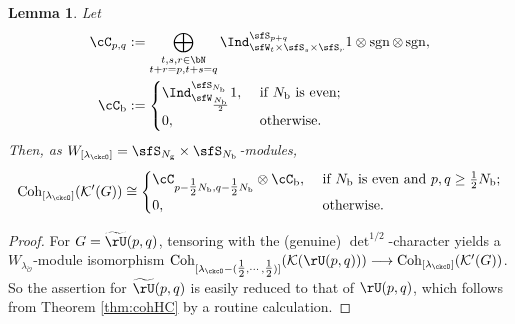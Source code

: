 \documentclass[12pt,a4paper]{amsart}
\newcommand{\trivial}[2][]{\if\relax\detokenize{#1}\relax
  {%
      \color{orange} \vspace{0em} $[$  #2 $]$
      \color{black}
  }
  \else
\ifx#1h
\ifcsname showtrivial\endcsname
{%
    \color{orange} \vspace{0em}  $[$ #2 $]$
    \color{black}
}
\fi
\else {\red Wrong argument!} \fi
\fi
}
\newcommand{\CK}{{\mathcal {K}}}
\newcommand{\CO}{{\mathcal {O}}}
\newcommand{\sgn}{\operatorname{sgn}}
\renewcommand{\t}{\mathfrak t}
\numberwithin{equation}{section}
\newtheorem{lem}[thm]{Lemma}
\theoremstyle{remark}
\def\half{{\tfrac{1}{2}}}
\def\lamck{\lambda_\ckcO}
\def\Lamck{[\lambda_\ckcO]}
\def\WLamck{W_{[\lambda_{\ckcO}]}}
\def\nbb{n_{\mathrm b}}
\def\tU{\widetilde{\rU}}
\def\Coh{\mathrm{Coh}}
\def\Gg{G_{\mathrm g}}
\newcommand{\Lam}{{[\lambda]}}
\begin{document}

\begin{lem}\label{lem:ccrU}
  Let
\[
  \begin{split}
    \cC_{p,q} &:= \bigoplus_{\substack{t,s,r\in \bN\\t+r=p, t+s = q}}
    \Ind_{\sfW_{t}\times \sfS_s\times \sfS_r}^{\sfS_{p+q}}
 1\otimes \sgn \otimes \sgn ,\\
 \cC_{\mathrm b} &:= \begin{cases}
  \Ind_{\sfW_{\frac{N_{\mathrm b}}{2}}}^{\sfS_{N_{\mathrm b}}} 1, & \ \text{if $N_{\mathrm b}$ is even};\\
  0, & \ \text{otherwise}.
 \end{cases}
  \end{split}
\]
Then, as $\WLamck =\sfS_{N_{\mathrm g}}\times \sfS_{N_{\mathrm b}}$-modules,
\[
  \Coh_{\Lamck}(\CK'(G)) \cong \begin{cases}
    \cC_{p-\half N_{\mathrm b},q-\half N_{\mathrm b}}\otimes \cC_{\mathrm b}, &\  \text{if $N_{\mathrm b}$ is even and
      $p,q \geq \half N_{\mathrm b}$};\\
    0, & \ \text{otherwise}.
  \end{cases}
\]
\end{lem}
\begin{proof}
  For $G=\tU(p,q)$, tensoring with the (genuine) $\det^{1/2}$-character yields a
  $W_{\lambda_{\check \CO}}$-module isomorphism
  $\Coh_{[\lamck-(\half, \cdots, \half)]}(\CK(\rU(p,q))) \longrightarrow \Coh_{\Lamck}(\CK'(G))$.
  So the assertion for $\tU(p,q)$ is easily reduced to that of $\rU(p,q)$, which follows from Theorem \ref{thm:cohHC} by a routine
  calculation.
\end{proof}



\end{document}
